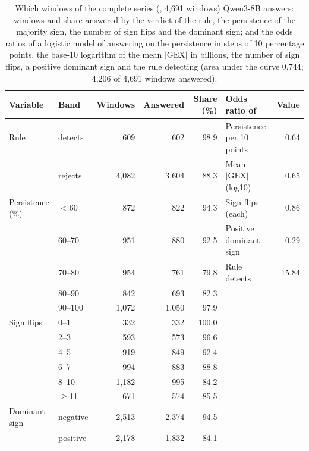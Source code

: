 \begin{table}[H]
\centering
\caption{Which windows of the complete series (, 4{,}691 windows) Qwen3-8B answers: windows and share answered by the verdict of the rule, the persistence of the majority sign, the number of sign flips and the dominant sign; and the odds ratios of a logistic model of answering on the persistence in steps of 10 percentage points, the base-10 logarithm of the mean $|\mathrm{GEX}|$ in billions, the number of sign flips, a positive dominant sign and the rule detecting (area under the curve 0.744; 4{,}206 of 4{,}691 windows answered).}
\label{tab:s:bands}
\scriptsize
\setlength{\tabcolsep}{3pt}
\begin{tabular}{@{}llrrr@{\hspace{2em}}lr@{}}
\toprule
Variable & Band & Windows & Answered & Share (\%) & Odds ratio of & Value \\
\midrule
Rule & detects & 609 & 602 & 98.9 & Persistence per 10 points & 0.64 \\
 & rejects & 4{,}082 & 3{,}604 & 88.3 & Mean $|\mathrm{GEX}|$ (log10) & 0.65 \\
Persistence (\%) & $<$60 & 872 & 822 & 94.3 & Sign flips (each) & 0.86 \\
 & 60--70 & 951 & 880 & 92.5 & Positive dominant sign & 0.29 \\
 & 70--80 & 954 & 761 & 79.8 & Rule detects & 15.84 \\
 & 80--90 & 842 & 693 & 82.3 & & \\
 & 90--100 & 1{,}072 & 1{,}050 & 97.9 & & \\
Sign flips & 0--1 & 332 & 332 & 100.0 & & \\
 & 2--3 & 593 & 573 & 96.6 & & \\
 & 4--5 & 919 & 849 & 92.4 & & \\
 & 6--7 & 994 & 883 & 88.8 & & \\
 & 8--10 & 1{,}182 & 995 & 84.2 & & \\
 & $\geq$11 & 671 & 574 & 85.5 & & \\
Dominant sign & negative & 2{,}513 & 2{,}374 & 94.5 & & \\
 & positive & 2{,}178 & 1{,}832 & 84.1 & & \\
\bottomrule
\end{tabular}
\end{table}

